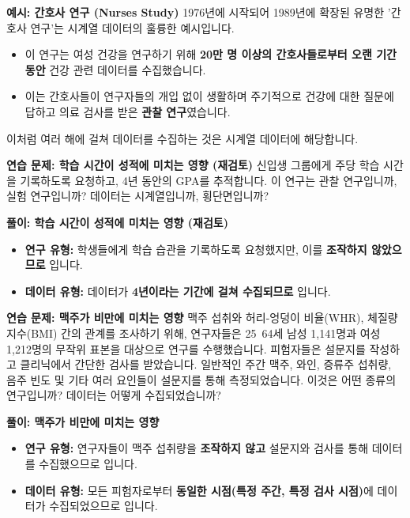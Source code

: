 \documentclass[11pt,a4paper]{article}
\theoremstyle{definition}
\begin{document}
\begin{examplebox}
\textbf{예시: 간호사 연구 (Nurses Study)}
1976년에 시작되어 1989년에 확장된 유명한 '간호사 연구'는 시계열 데이터의 훌륭한 예시입니다.
\begin{itemize}
    \item 이 연구는 여성 건강을 연구하기 위해 \textbf{20만 명 이상의 간호사들로부터 오랜 기간 동안} 건강 관련 데이터를 수집했습니다.
    \item 이는 간호사들이 연구자들의 개입 없이 생활하며 주기적으로 건강에 대한 질문에 답하고 의료 검사를 받은 \textbf{관찰 연구}였습니다.
\end{itemize}
이처럼 여러 해에 걸쳐 데이터를 수집하는 것은 시계열 데이터에 해당합니다.
\end{examplebox}

\begin{practicebox}
\textbf{연습 문제: 학습 시간이 성적에 미치는 영향 (재검토)}
신입생 그룹에게 주당 학습 시간을 기록하도록 요청하고, 4년 동안의 GPA를 추적합니다.
이 연구는 관찰 연구입니까, 실험 연구입니까? 데이터는 시계열입니까, 횡단면입니까?
\end{practicebox}

\begin{solutionbox}
\textbf{풀이: 학습 시간이 성적에 미치는 영향 (재검토)}
\begin{itemize}
    \item \textbf{연구 유형:} 학생들에게 학습 습관을 기록하도록 요청했지만, 이를 \textbf{조작하지 않았으므로} 입니다.
    \item \textbf{데이터 유형:} 데이터가 \textbf{4년이라는 기간에 걸쳐 수집되므로} 입니다.
\end{itemize}
\end{solutionbox}

\begin{practicebox}
\textbf{연습 문제: 맥주가 비만에 미치는 영향}
맥주 섭취와 허리-엉덩이 비율(WHR), 체질량 지수(BMI) 간의 관계를 조사하기 위해, 연구자들은 25~64세 남성 1,141명과 여성 1,212명의 무작위 표본을 대상으로 연구를 수행했습니다. 피험자들은 설문지를 작성하고 클리닉에서 간단한 검사를 받았습니다. 일반적인 주간 맥주, 와인, 증류주 섭취량, 음주 빈도 및 기타 여러 요인들이 설문지를 통해 측정되었습니다.
이것은 어떤 종류의 연구입니까? 데이터는 어떻게 수집되었습니까?
\end{practicebox}

\begin{solutionbox}
\textbf{풀이: 맥주가 비만에 미치는 영향}
\begin{itemize}
    \item \textbf{연구 유형:} 연구자들이 맥주 섭취량을 \textbf{조작하지 않고} 설문지와 검사를 통해 데이터를 수집했으므로 입니다.
    \item \textbf{데이터 유형:} 모든 피험자로부터 \textbf{동일한 시점(특정 주간, 특정 검사 시점)}에 데이터가 수집되었으므로 입니다.
\end{itemize}
\end{solutionbox}
\end{document}
